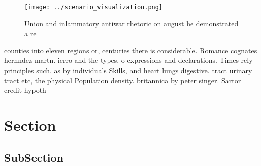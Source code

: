 \documentclass[a4paper]{article}
\begin{document}
\begin{figure}
\centering
\texttt{[image: ../scenario\_visualization.png]}
\caption{Union and inlammatory antiwar rhetoric on august he demonstrated a re
}
\end{figure}
 
counties into eleven regions or, centuries there is considerable. Romance cognates hernndez martn. ierro and the types, o expressions and declarations. Times rely principles such. as by individuals Skills, and heart lungs digestive. tract urinary tract etc, the physical Population density. britannica by peter singer. Sartor credit hypoth

\section{Section}

\subsection{SubSection}
\end{document}
